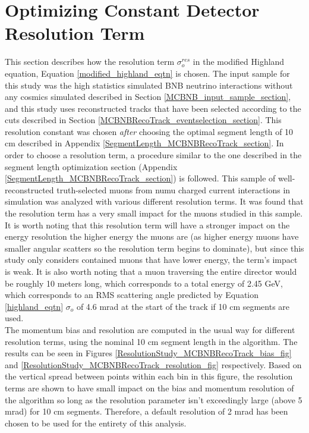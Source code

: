 \section{Optimizing Constant Detector Resolution Term}\label{ResolutionStudy_MCBNBRecoTrack_section}
This section describes how the resolution term $\sigma_o^{res}$ in the modified Highland equation, Equation \ref{modified_highland_eqtn} is chosen. The input sample for this study was the high statistics simulated BNB neutrino interactions without any cosmics simulated described in Section \ref{MCBNB_input_sample_section}, and this study uses reconstructed tracks that have been selected according to the cuts described in Section \ref{MCBNBRecoTrack_eventselection_section}. This resolution constant was chosen \textit{after} choosing the optimal segment length of 10 cm described in Appendix \ref{SegmentLength_MCBNBRecoTrack_section}. In order to choose a resolution term, a procedure similar to the one described in the segment length optimization section (Appendix \ref{SegmentLength_MCBNBRecoTrack_section}) is followed. This sample of well-reconstructed truth-selected muons from numu charged current interactions in simulation was analyzed with various different resolution terms. It was found that the resolution term has a very small impact for the muons studied in this sample. It is worth noting that this resolution term will have a stronger impact on the energy resolution the higher energy the muons are (as higher energy muons have smaller angular scatters so the resolution term begins to dominate), but since this study only considers contained muons that have lower energy, the term's impact is weak. It is also worth noting that a muon traversing the entire director would be roughly 10 meters long, which corresponds to a total energy of 2.45 GeV, which corresponds to an RMS scattering angle predicted by Equation \ref{highland_eqtn} $\sigma_o$ of 4.6 mrad at the start of the track if 10 cm segments are used.\\

The momentum bias and resolution are computed in the usual way for different resolution terms, using the nominal 10 cm segment length in the algorithm. The results can be seen in Figures \ref{ResolutionStudy_MCBNBRecoTrack_bias_fig} and \ref{ResolutionStudy_MCBNBRecoTrack_resolution_fig} respectively. Based on the vertical spread between points within each bin in this figure, the resolution terms are shown to have small impact on the bias and momentum resolution of the algorithm so long as the resolution parameter isn't exceedingly large (above 5 mrad) for 10 cm segments. Therefore, a default resolution of 2 mrad has been chosen to be used for the entirety of this analysis.

